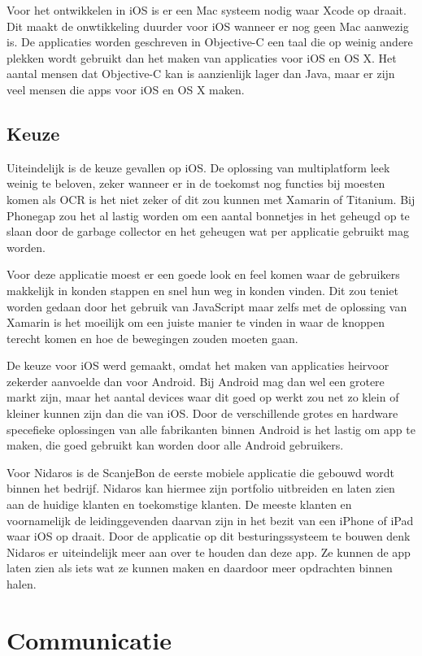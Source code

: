 \documentclass[a4paper,11pt,oneside]{report}
\begin{document}
Voor het ontwikkelen in iOS is er een Mac systeem nodig waar Xcode op draait.
Dit maakt de onwtikkeling duurder voor iOS wanneer er nog geen Mac aanwezig is.
De applicaties worden geschreven in Objective-C een taal die op weinig andere
plekken wordt gebruikt dan het maken van applicaties voor iOS en OS X. Het
aantal mensen dat Objective-C kan is aanzienlijk lager dan Java, maar er zijn
veel mensen die apps voor iOS en OS X maken.


\subsection{Keuze}
Uiteindelijk is de keuze gevallen op iOS. De oplossing van multiplatform leek
weinig te beloven, zeker wanneer er in de toekomst nog functies bij moesten
komen als OCR is het niet zeker of dit zou kunnen met Xamarin of Titanium. Bij
Phonegap zou het al lastig worden om een aantal bonnetjes in het geheugd op te
slaan door de garbage collector en het geheugen wat per applicatie gebruikt mag
worden.

Voor deze applicatie moest er een goede look en feel komen waar de gebruikers
makkelijk in konden stappen en snel hun weg in konden vinden. Dit zou teniet
worden gedaan door het gebruik van JavaScript maar zelfs met de oplossing van
Xamarin is het moeilijk om een juiste manier te vinden in waar de knoppen
terecht komen en hoe de bewegingen zouden moeten gaan.

De keuze voor iOS werd gemaakt, omdat het maken van applicaties heirvoor
zekerder aanvoelde dan voor Android. Bij Android mag dan wel een grotere markt
zijn, maar het aantal devices waar dit goed op werkt zou net zo klein of kleiner
kunnen zijn dan die van iOS. Door de verschillende grotes en hardware specefieke
oplossingen van alle fabrikanten binnen Android is het lastig om app te maken,
die goed gebruikt kan worden door alle Android gebruikers.

Voor Nidaros is de ScanjeBon de eerste mobiele applicatie die gebouwd wordt
binnen het bedrijf. Nidaros kan hiermee zijn portfolio uitbreiden en laten zien
aan de huidige klanten en toekomstige klanten. De meeste klanten en voornamelijk
de leidinggevenden daarvan zijn in het bezit van een iPhone of iPad waar iOS op
draait. Door de applicatie op dit besturingssysteem te bouwen denk Nidaros er
uiteindelijk meer aan over te houden dan deze app. Ze kunnen de app laten zien
als iets wat ze kunnen maken en daardoor meer opdrachten binnen halen.


\section{Communicatie}
\end{document}
